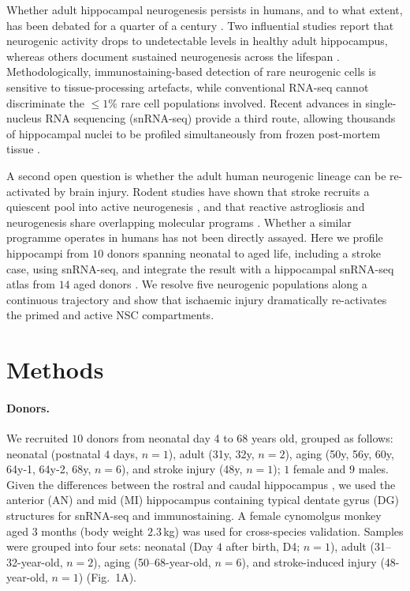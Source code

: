 \documentclass[11pt]{article}
\begin{document}
Whether adult hippocampal neurogenesis persists in humans, and to what extent, has been debated for a quarter of a century \cite{eriksson1998,spalding2013,sorrells2018,boldrini2018,moreno2019,kempermann2018human}. Two influential studies \cite{sorrells2018,moreno2019} report that neurogenic activity drops to undetectable levels in healthy adult hippocampus, whereas others document sustained neurogenesis across the lifespan \cite{boldrini2018,spalding2013}. Methodologically, immunostaining-based detection of rare neurogenic cells is sensitive to tissue-processing artefacts, while conventional RNA-seq cannot discriminate the $\le 1\%$ rare cell populations involved. Recent advances in single-nucleus RNA sequencing (snRNA-seq) \cite{habib2017nuclei,lacar2016nuclear} provide a third route, allowing thousands of hippocampal nuclei to be profiled simultaneously from frozen post-mortem tissue \cite{zhou2022snrnaseq}.

A second open question is whether the adult human neurogenic lineage can be re-activated by brain injury. Rodent studies have shown that stroke recruits a quiescent pool into active neurogenesis \cite{arvidsson2002stroke,jin2006stroke,duan2014stroke}, and that reactive astrogliosis and neurogenesis share overlapping molecular programs \cite{liddelow2017neurotoxic,magnusson2014regen,kimelberg2010reactive}. Whether a similar programme operates in humans has not been directly assayed. Here we profile hippocampi from $10$ donors spanning neonatal to aged life, including a stroke case, using snRNA-seq, and integrate the result with a hippocampal snRNA-seq atlas from $14$ aged donors \cite{zhou2022snrnaseq}. We resolve five neurogenic populations along a continuous trajectory and show that ischaemic injury dramatically re-activates the primed and active NSC compartments.

\section{Methods}

\paragraph{Donors.} We recruited $10$ donors from neonatal day 4 to $68$ years old, grouped as follows: neonatal (postnatal $4$ days, $n = 1$), adult (31y, 32y, $n = 2$), aging (50y, 56y, 60y, 64y-1, 64y-2, 68y, $n = 6$), and stroke injury (48y, $n = 1$); $1$ female and $9$ males. Given the differences between the rostral and caudal hippocampus \cite{wu2014hippocampus}, we used the anterior (AN) and mid (MI) hippocampus containing typical dentate gyrus (DG) structures for snRNA-seq and immunostaining. A female cynomolgus monkey aged $3$ months (body weight $2.3$\,kg) was used for cross-species validation. Samples were grouped into four sets: neonatal (Day $4$ after birth, D4; $n=1$), adult (31--32-year-old, $n=2$), aging (50--68-year-old, $n=6$), and stroke-induced injury (48-year-old, $n=1$) (Fig.~1A).
\end{document}
